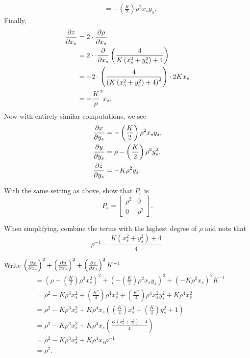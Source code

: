 \documentclass{ximera}
\begin{document}
\begin{problem}
\begin{freeResponse}
\begin{align*}
      &= -\left(\frac{K}{2}\right)\rho^2x_sy_s.
      \end{align*}
      Finally,
      \begin{align*}
      \pp[z]{x_s} &= 2\cdot\pp[\rho]{x_s}\\
      &= 2\cdot\cdot \pp{x_s}\left(\frac{4}{K\left(x_s^2 + y_s^2\right) + 4}\right)\\
      &= - 2\cdot \left(\frac{4}{\left(K\left(x_s^2 + y_s^2\right) + 4\right)^{2}}\right)\cdot2Kx_s \\
      &= -\frac{K}\rho^2x_s.
      \end{align*}
      Now with entirely similar computations, we see
      \begin{align*}
        \pp[x]{y_s} &= -\left(\frac{K}{2}\right)\rho^2x_sy_s,\\
        \pp[y]{y_s} &=\rho-\left(\frac{K}{2}\right)\rho^2y_s^2,\\
        \pp[z]{y_s} &= -K\rho^2y_s.       
      \end{align*}
  \end{freeResponse}
\end{problem}


\begin{problem}
With the same setting as above, show that $P_s$ is
  \[
  P_s =
  \begin{bmatrix}
    \rho^2 & 0\\
    0 & \rho^2
  \end{bmatrix}.
  \]
  \begin{hint}
  When simplifying, combine the terms with the highest degree of $\rho$
  and note that
  \[
  \rho^{-1} = \frac{K\left(x_s^2 + y_s^2\right)+4}{4}.
  \]
\end{hint}
\begin{freeResponse}
  Write $\left(\pp[x]{x_s}\right)^2 + \left(\pp[y]{x_s}\right)^2 +\left(\pp[z]{x_s}\right)^2K^{-1}$
  \begin{align*}
    &=\left(\rho-\left(\frac{K}{2}\right)\rho^2x_s^2\right)^2 + \left(-\left(\frac{K}{2}\right)\rho^2x_sy_s\right)^2 +\left(-K\rho^2x_s\right)^2K^{-1}\\
    &=\rho^2 -K\rho^3x_s^2 + \left(\frac{K^2}{4}\right)\rho^4x_s^4 + \left(\frac{K^2}{4}\right)\rho^4x_s^2y_s^2 + K\rho^4x_s^2\\
    &=\rho^2 -K\rho^3x_s^2 + K\rho^4x_s\left(\left(\frac{K}{4}\right)x_s^4 + \left(\frac{K}{4}\right)y_s^2 + 1\right)\\
    &=\rho^2 -K\rho^3x_s^2 + K\rho^4x_s\left(\frac{K\left(x_s^2+y_s^2\right)+4}{4}\right)\\
    &=\rho^2 -K\rho^3x_s^2 + K\rho^4x_s\rho^{-1}\\
    &=\rho^2.
  \end{align*}
\end{freeResponse}
\end{problem}
\end{document}
